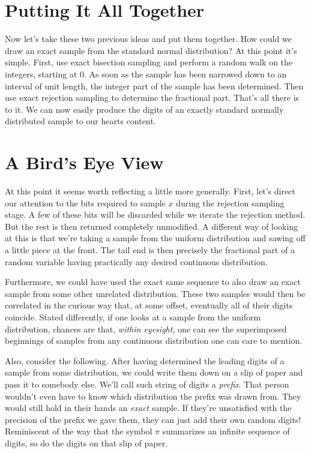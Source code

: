 \documentclass{article}
\begin{document}
\section{Putting It All Together}

Now let's take these two previous ideas and put them together. How could we draw an exact sample from the standard normal distribution? At this point it's simple. First, use exact bisection sampling and perform a random walk on the integers, starting at 0. As soon as the sample has been narrowed down to an interval of unit length, the integer part of the sample has been determined. Then use exact rejection sampling to determine the fractional part. That's all there is to it. We can now easily produce the digits of an exactly standard normally distributed sample to our hearts content.

\section{A Bird's Eye View}

At this point it seems worth reflecting a little more generally. First, let's direct our attention to the bits required to sample $x$ during the rejection sampling stage. A few of these bits will be discarded while we iterate the rejection method. But the rest is then returned completely unmodified. A different way of looking at this is that we're taking a sample from the uniform distribution and sawing off a little piece at the front. The tail end is then precisely the fractional part of a random variable having practically any desired continuous distribution.

Furthermore, we could have used the exact same sequence to also draw an exact sample from some other unrelated distribution. These two samples would then be correlated in the curious way that, at some offset, eventually all of their digits coincide. Stated differently, if one looks at a sample from the uniform distribution, chances are that, \textit{within eyesight}, one can see the superimposed beginnings of samples from any continuous distribution one can care to mention.

Also, consider the following. After having determined the leading digits of a sample from some distribution, we could write them down on a slip of paper and pass it to somebody else. We'll call such string of digits a \textit{prefix}. That person wouldn't even have to know which distribution the prefix was drawn from. They would still hold in their hands an \textit{exact} sample. If they're unsatisfied with the precision of the prefix we gave them, they can just add their own random digits! Reminiscent of the way that the symbol $\pi$ summarizes an infinite sequence of digits, so do the digits on that slip of paper.
\end{document}
